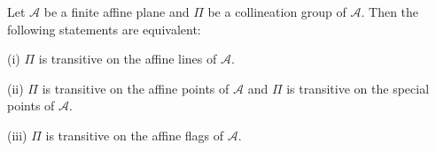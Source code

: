 Let $\mathcal{A}$ be a finite affine plane and $\Pi$ be a collineation group of $\mathcal{A}$. Then the following statements are equivalent:

(i) $\Pi$ is transitive on the affine lines of $\mathcal{A}$.

(ii) $\Pi$ is transitive on the affine points of $\mathcal{A}$ and $\Pi$ is transitive on the special points of $\mathcal{A}$.

(iii) $\Pi$ is transitive on the affine flags of $\mathcal{A}$.
